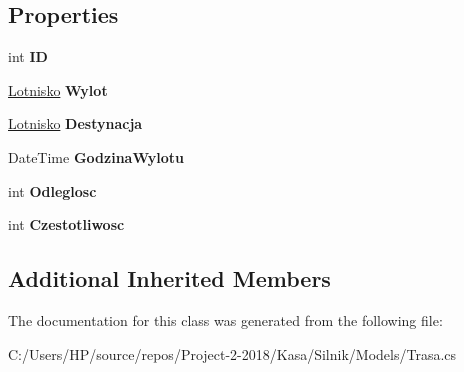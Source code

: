 \subsection*{Properties}
\begin{DoxyCompactItemize}
\item 
\mbox{\label{class_silnik_1_1_trasa_a65bcfc1111e4909e0d690f411485bfd2}} 
int {\bfseries ID}
\item 
\mbox{\label{class_silnik_1_1_trasa_ae2d5aeb92c77808405469f00ff197ebe}} 
\mbox{\hyperlink{class_silnik_1_1_lotnisko}{Lotnisko}} {\bfseries Wylot}
\item 
\mbox{\label{class_silnik_1_1_trasa_acf60c1f4bcdad279d4c8e8c4b6683ee0}} 
\mbox{\hyperlink{class_silnik_1_1_lotnisko}{Lotnisko}} {\bfseries Destynacja}
\item 
\mbox{\label{class_silnik_1_1_trasa_a778d97e8538c64bbde98d6bbae1bd022}} 
Date\+Time {\bfseries Godzina\+Wylotu}
\item 
\mbox{\label{class_silnik_1_1_trasa_a6a8f71ffcf9cc3a914e4571d4528ab76}} 
int {\bfseries Odleglosc}
\item 
\mbox{\label{class_silnik_1_1_trasa_a29c850dd0bd50113ea31d0b8b2811e36}} 
int {\bfseries Czestotliwosc}
\end{DoxyCompactItemize}
\subsection*{Additional Inherited Members}


The documentation for this class was generated from the following file\+:\begin{DoxyCompactItemize}
\item 
C\+:/\+Users/\+H\+P/source/repos/\+Project-\/2-\/2018/\+Kasa/\+Silnik/\+Models/Trasa.\+cs\end{DoxyCompactItemize}
